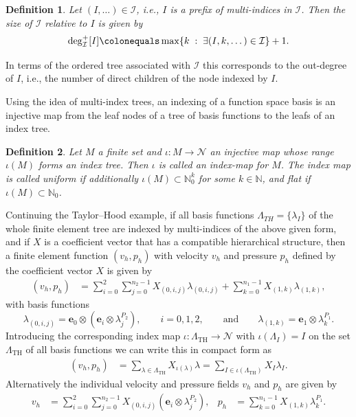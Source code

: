 \documentclass[a4paper,10pt,headings=normal,bibliography=totoc]{scrartcl}
\newtheorem{definition}{Definition}
\newcommand{\op}[1]{\operatorname{#1}}
\newcommand{\st}{\; : \;}
\begin{document}
\begin{definition}
Let $(I,\dots) \in \mathcal{I}$, i.e., $I$ is a
prefix of multi-indices in $\mathcal{I}$. Then the size of $\mathcal{I}$ relative
to $I$ is given by
\begin{align}\label{eq:prefix_size}
  \operatorname{deg}^+_{\mathcal{I}}[I] \colonequals  \op{max}\{k \st \exists (I,k,\dots) \in \mathcal{I} \}+1.
\end{align}
\end{definition}
In terms of the ordered tree associated with $\mathcal{I}$ this corresponds
to the out-degree of $I$, i.e., the number of direct children of the node indexed by $I$.

Using the idea of multi-index trees,
an indexing of a function space basis is an injective map from the leaf nodes of a tree of basis functions to the leafs of an
index tree.

\begin{definition}
  Let $M$ a finite set and $\iota:M \to \mathcal{N}$ an injective map whose range
  $\iota(M)$ forms an index tree.
  Then $\iota$ is called an \emph{index-map} for $M$.
  The index map is called \emph{uniform} if additionally $\iota(M) \subset \mathbb{N}^k_0$ for some $k \in \mathbb{N}$,
  and \emph{flat} if $\iota(M) \subset \mathbb{N}_0$.
\end{definition}

Continuing the Taylor--Hood example, if
all basis functions $\Lambda_{TH} = \{\lambda_I \}$ of the whole finite element tree are
indexed by multi-indices of the above given form,
and if $X$ is a coefficient vector that has a compatible hierarchical structure,
then a finite element function $(v_h,p_h)$ with velocity
$v_h$ and pressure $p_h$ defined by the coefficient vector $X$
is given by
\begin{align}
\label{eq:linear_combination}
  (v_h,p_h)
  &= \sum_{i=0}^2\sum_{j=0}^{n_2-1} X_{(0,i,j)}\lambda_{(0,i,j)}
  + \sum_{k=0}^{n_1-1} X_{(1,k)}\lambda_{(1,k)},
\end{align}
with basis functions
\begin{equation*}
  \lambda_{(0,i,j)} = \mathbf{e}_0 \otimes (\mathbf{e}_i \otimes \lambda^{P_2}_j), \qquad i=0,1,2,
    \qquad \text{and} \qquad
    \lambda_{(1,k)} = \mathbf{e}_1 \otimes \lambda^{P_1}_k.
\end{equation*}
Introducing the corresponding index map $\iota : \Lambda_{\text{TH}} \to \mathcal{N}$
with $\iota(\Lambda_I)=I$ on the set $\Lambda_{\text{TH}}$ of all basis functions
we can write this in compact form as
\begin{align*}
  (v_h,p_h) &= \sum_{\lambda \in \Lambda_{\text{TH}}} X_{\iota(\lambda)} \lambda
            = \sum_{I \in \iota(\Lambda_{\text{TH}})} X_I \lambda_I.
\end{align*}
Alternatively the individual velocity and pressure fields
$v_h$ and $p_h$ are given by
\begin{align*}
  v_h &= \sum_{i=0}^2 \sum_{j=0}^{n_2-1} X_{(0,i,j)} (\mathbf{e}_i \otimes \lambda^{P_2}_j),
    &
    p_h &= \sum_{k=0}^{n_1-1} X_{(1,k)}\lambda^{P_1}_k.
\end{align*}
\end{document}
